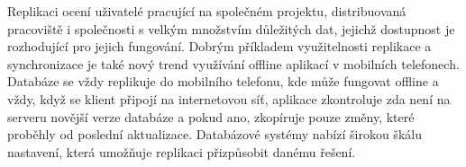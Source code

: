Replikaci ocení uživatelé pracující na společném projektu, distribuovaná pra\-co\-viš\-tě i společnosti s velkým množstvím důležitých dat, jejichž dostupnost je rozhodující pro jejich fungování. Dobrým příkladem využitelnosti replikace a synchronizace je také nový trend využívání offline aplikací v mobilních telefonech. Databáze se vždy replikuje do mobilního telefonu, kde může fungovat offline a vždy, když se klient připojí na internetovou síť, aplikace zkontroluje zda není na serveru novější verze databáze a pokud ano, zkopíruje pouze změny, které proběhly od poslední aktualizace. Databázové systémy nabízí širokou škálu nastavení, která umožňuje replikaci přizpůsobit danému řešení.


